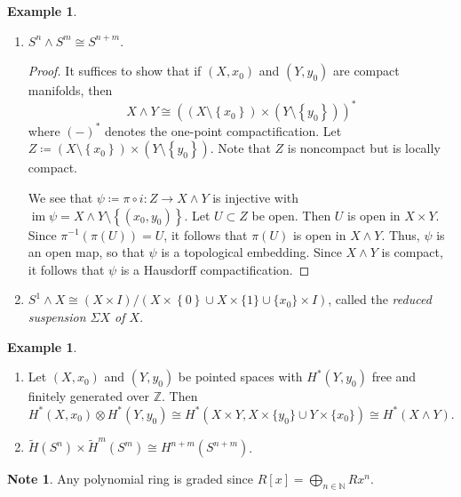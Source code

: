 \documentclass[10pt,letterpaper,cm]{nupset}
\theoremstyle{definition}
\newtheorem{exmp}[definition]{Example}
\newtheorem{note}[definition]{Note}
\theoremstyle{theorem}
\theoremstyle{remark}
\newcommand{\N}{\mathbb N}
\newcommand{\Z}{\mathbb Z}
\newcommand{\1}{\mathbb{1}}
\newcommand{\0}{\vec 0}
\DeclareMathOperator{\im}{im}
\begin{document}
\begin{exmp} $ $
\begin{enumerate}
\item $S^n \wedge  S^m \cong S^{n+m}$.
\begin{proof}
 It suffices to show that if $\left(X, x_0\right)$ and $\left(Y, y_0\right)$ are compact manifolds, then $$X \wedge Y \cong \left(\left(X \setminus \left\{x_0\right\}\right) \times \left(Y \setminus \left\{y_0\right\}\right)\right)^{\ast}$$ where $\left({-}\right)^{\ast}$ denotes the one-point compactification. Let $Z\coloneqq  \left(X \setminus \left\{x_0\right\}\right) \times \left(Y \setminus \left\{y_0\right\}\right)$. Note that $Z$ is noncompact but is locally compact. 
 
 We see that $\psi \coloneqq  \pi \circ i : Z \to X \wedge Y$ is injective with $\im{\psi} = X \wedge Y \setminus \left\{\left(x_0, y_0\right)\right\}$. Let $U \subset Z$ be open. Then $U$ is open in $X \times Y$.  Since $\pi^{-1}(\pi(U)) = U$, it follows that $\pi(U)$ is open in $X \wedge Y$. Thus, $\psi$ is an open map, so that $\psi$ is a topological embedding. Since $X \wedge Y$ is compact, it follows that $\psi$ is a Hausdorff compactification. 
\end{proof}
\item $S^1 \wedge X \cong \left(X\times I\right)/\left(X\times \left\{0\right\}\cup X\times \{1\}\cup \{x_{0}\}\times I\right)$, called the \textit{reduced suspension $\Sigma{X}$ of $X$}.
\end{enumerate}
\end{exmp}

\begin{exmp} $ $
\begin{enumerate}
\item Let $\left(X, x_0\right)$ and $\left(Y, y_0\right)$ be pointed spaces with $H^{\ast}\left(Y, y_0\right)$ free and finitely generated over $\Z$. Then $H^{\ast}\left(X, x_0\right) \otimes H^{\ast}\left(Y, y_0\right) \cong H^{\ast}(X \times Y, X \times \{y_0\} \cup Y \times \{x_0\}) \cong H^{\ast}(X \wedge Y)    .$
\item  $\widetilde{H}(S^n) \times \widetilde{H}^m(S^m) \cong H^{n+m}(S^{n+m})$.
\end{enumerate}
\end{exmp}

\bigskip

\begin{note}
Any polynomial ring is graded since $R[x] = \bigoplus_{n \in \N} Rx^n$.
\end{note}
\end{document}
